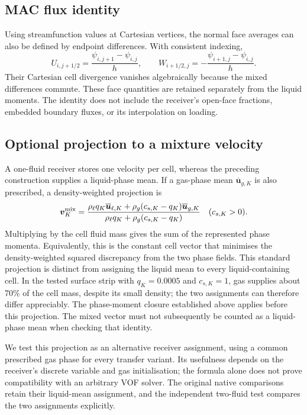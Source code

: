 \documentclass[10pt]{article}
\begin{document}
\subsection{MAC flux identity}
Using streamfunction values at Cartesian vertices, the normal face averages
can also be defined by endpoint differences. With consistent indexing,
\begin{equation}
 U_{i,j+1/2}=\frac{\psi_{i,j+1}-\psi_{i,j}}{h},\qquad
 W_{i+1/2,j}=-\frac{\psi_{i+1,j}-\psi_{i,j}}{h}.
\end{equation}
Their Cartesian cell divergence vanishes algebraically because the mixed
differences commute. These face quantities are retained separately from the
liquid moments. The identity does not include the receiver's open-face
fractions, embedded boundary fluxes, or its interpolation on loading.

\subsection{Optional projection to a mixture velocity}
A one-fluid receiver stores one velocity per cell, whereas the preceding
construction supplies a liquid-phase mean. If a gas-phase mean
$\overline{\boldsymbol u}_{g,K}$ is also prescribed, a density-weighted
projection is
\begin{equation}
 \boldsymbol v_K^{\rm mix}=
 \frac{\rho_\ell q_K\overline{\boldsymbol u}_{\ell,K}
       +\rho_g(c_{s,K}-q_K)\overline{\boldsymbol u}_{g,K}}
      {\rho_\ell q_K+\rho_g(c_{s,K}-q_K)}
 \quad(c_{s,K}>0).
 \label{eq:mixture-projection}
\end{equation}
Multiplying by the cell fluid mass gives the sum of the represented
phase momenta. Equivalently, this is the constant cell vector that minimises
the density-weighted squared discrepancy from the two phase fields.
This standard projection is distinct from assigning the liquid mean to
every liquid-containing cell. In the tested surface strip with
$q_K=0.0005$ and $c_{s,K}=1$, gas supplies about 70\% of the cell mass,
despite its small density; the two assignments can therefore differ
appreciably. The phase-moment closure established above applies before
this projection. The mixed vector must not subsequently be counted as a
liquid-phase mean when checking that identity.

We test this projection as an alternative receiver assignment, using a
common prescribed gas phase for every transfer variant. Its usefulness
depends on the receiver's discrete variable and gas initialisation; the
formula alone does not prove compatibility with an arbitrary VOF solver.
The original native comparisons retain their liquid-mean assignment, and
the independent two-fluid test compares the two assignments explicitly.
\end{document}
